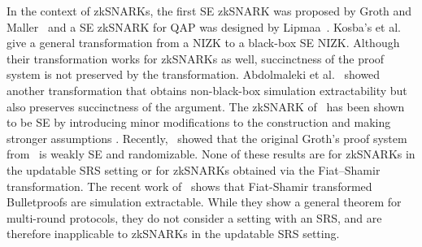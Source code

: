 In the context of zkSNARKs, the first
SE zkSNARK was proposed by Groth and Maller~\cite{C:GroMal17} and a SE
zkSNARK for QAP was designed by Lipmaa~\cite{EPRINT:Lipmaa19a}.
Kosba's et
al.~\cite{EPRINT:KZMQCP15} give a general transformation from a NIZK to a
black-box SE NIZK. Although their transformation works for zkSNARKs as well,
succinctness of the proof system is not preserved by the transformation.
Abdolmaleki et al.~\cite{CCS:AbdRamSla20} showed another transformation that
obtains non-black-box simulation extractability but also preserves
succinctness of the argument. 
The zkSNARK of~\cite{EC:Groth16} has been shown to be SE by introducing minor modifications to the construction and making
stronger assumptions \cite{EPRINT:BowGab18,EPRINT:AtaBag19}. Recently,~\cite{EPRINT:BKSV20} showed that the
original Groth's proof system from~\cite{EC:Groth16} is weakly SE and
randomizable. None of these results are for zkSNARKs in the updatable SRS setting or for zkSNARKs obtained via the Fiat--Shamir transformation. The recent work of~\cite{cryptoeprint:GOPTT22} shows that Fiat-Shamir transformed Bulletproofs are simulation extractable. While they show a general theorem for multi-round protocols, they do not consider a setting with an SRS, and are therefore inapplicable to zkSNARKs in the updatable SRS setting.



